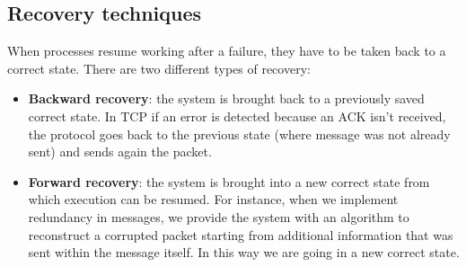\documentclass[10pt,a4paper]{article}
\begin{document}
\subsection{Recovery techniques}
When processes resume working after a failure, they have to be taken back to a correct state. There are two different types of recovery:
\begin{itemize}
	\item \textbf{Backward recovery}: the system is brought back to a previously saved correct state. In TCP if an error is detected because an ACK isn't received, the protocol goes back to the previous state (where message was not already sent) and sends again the packet.
	\item \textbf{Forward recovery}: the system is brought into a new correct state from which execution can be resumed. For instance, when we implement redundancy in messages, we provide the system with an algorithm to reconstruct a corrupted packet starting from additional information that was sent within the message itself. In this way we are going in a new correct state.
\end{itemize}
\end{document}
